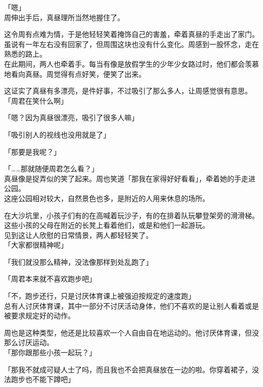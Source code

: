 「嗯」\\

周伸出手后，真昼理所当然地握住了。

这令周有点难为情，于是他轻轻笑着掩饰自己的害羞，牵着真昼的手走出了家门。\\

虽说有一年左右没有回家了，但周围这块也没有什么变化。周感到一股怀念，走在熟悉的路上。\\

在此期间，两人也牵着手。每当有像是放假学生的少年少女路过时，他们都会羡慕地看向真昼。周觉得有点好笑，便笑了出来。

这证实了真昼有多漂亮，是件好事，不过吸引了那么多人，让周感觉很有意思。\\

「周君在笑什么啊」

「嗯？因为真昼很漂亮，吸引了很多人嘛」

「吸引别人的视线也没用就是了」

「那要是我呢？」

「……那就随便周君怎么看？」\\

真昼像是捉弄似的笑了起来。周也笑道「那我在家得好好看看」，牵着她的手走进公园。\\

这座公园相对较大，自然景色也多，是附近的人用来休息的场所。

在大沙坑里，小孩子们有的在高喊着玩沙子，有的在排着队玩攀登架旁的滑滑梯。这些小孩的父母在附近的长凳上看着他们，或是和他们一起游玩。\\

见到这让人欣慰的日常情景，两人都轻轻笑了。\\

「大家都很精神呢」

「我们就没那么精神，没法像那样到处乱跑了」

「周君本来就不喜欢跑步吧」

「不，跑步还行，只是讨厌体育课上被强迫按规定的速度跑」\\

总有人讨厌体育课，其中一部分不讨厌活动身体，他们不喜欢的是让别人看着或是被要求规定好的动作。

周也是这种类型，他还是比较喜欢一个人自由自在地运动的。他讨厌体育课，但没那么讨厌运动。\\

「那你跟那些小孩一起玩？」

「那我不就成可疑人士了吗，而且我也不会把真昼放在一边的啦。你穿着裙子，没法跑步也不能下蹲吧」

